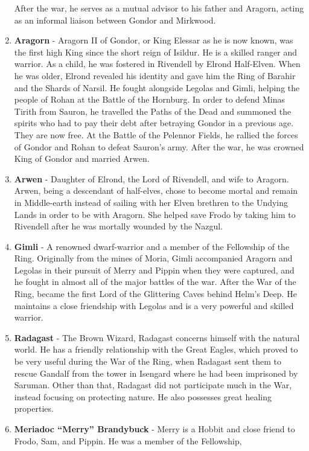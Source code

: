 \documentclass[10pt, letterpaper]{article}
\begin{document}
\begin{enumerate}
  After the war, he serves as a mutual advisor to his father and
  Aragorn, acting as an informal liaison between Gondor and Mirkwood.
\item
  \textbf{Aragorn} - Aragorn II of Gondor, or King Elessar as he is now
  known, was the first high King since the short reign of Isildur. He is
  a skilled ranger and warrior. As a child, he was fostered in Rivendell
  by Elrond Half-Elven. When he was older, Elrond revealed his identity
  and gave him the Ring of Barahir and the Shards of Narsil. He fought
  alongside Legolas and Gimli, helping the people of Rohan at the Battle
  of the Hornburg. In order to defend Minas Tirith from Sauron, he
  travelled the Paths of the Dead and summoned the spirits who had to
  pay their debt after betraying Gondor in a previous age. They are now
  free. At the Battle of the Pelennor Fields, he rallied the forces of
  Gondor and Rohan to defeat Sauron's army. After the war, he was
  crowned King of Gondor and married Arwen.
\item
  \textbf{Arwen} - Daughter of Elrond, the Lord of Rivendell, and wife
  to Aragorn. Arwen, being a descendant of half-elves, chose to become
  mortal and remain in Middle-earth instead of sailing with her Elven
  brethren to the Undying Lands in order to be with Aragorn. She helped
  save Frodo by taking him to Rivendell after he was mortally wounded by
  the Nazgul.
\item
  \textbf{Gimli} - A renowned dwarf-warrior and a member of the
  Fellowship of the Ring. Originally from the mines of Moria, Gimli
  accompanied Aragorn and Legolas in their pursuit of Merry and Pippin
  when they were captured, and he fought in almost all of the major
  battles of the war. After the War of the Ring, became the first Lord
  of the Glittering Caves behind Helm's Deep. He maintains a close
  friendship with Legolas and is a very powerful and skilled warrior.
\item
  \textbf{Radagast} - The Brown Wizard, Radagast concerns himself with
  the natural world. He has a friendly relationship with the Great
  Eagles, which proved to be very useful during the War of the Ring,
  when Radagast sent them to rescue Gandalf from the tower in Isengard
  where he had been imprisoned by Saruman. Other than that, Radagast did
  not participate much in the War, instead focusing on protecting
  nature. He also possesses great healing properties.
\item
  \textbf{Meriadoc ``Merry'' Brandybuck} - Merry is a Hobbit and close
  friend to Frodo, Sam, and Pippin. He was a member of the Fellowship,

\end{enumerate}
\end{document}
